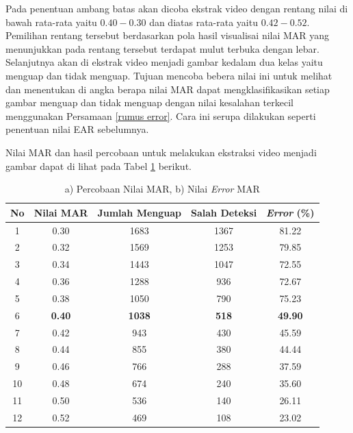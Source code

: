             Pada penentuan ambang batas akan dicoba ekstrak video dengan rentang nilai di bawah rata-rata yaitu $0.40 - 0.30$ dan diatas rata-rata yaitu $0.42 - 0.52$. Pemilihan rentang tersebut berdasarkan pola hasil visualisai nilai MAR yang menunjukkan pada rentang tersebut terdapat mulut terbuka dengan lebar. Selanjutnya akan di ekstrak video menjadi gambar kedalam dua kelas yaitu menguap dan tidak menguap. Tujuan mencoba bebera nilai ini untuk 
            melihat dan menentukan di angka berapa nilai MAR dapat mengklasifikasikan setiap gambar menguap dan tidak menguap dengan nilai kesalahan terkecil menggunakan Persamaan \ref{rumus error}. Cara ini serupa dilakukan seperti penentuan nilai EAR sebelumnya.
            
            Nilai MAR dan hasil percobaan untuk melakukan ekstraksi video menjadi gambar dapat di lihat pada Tabel \ref{Penentuan Nilai MAR} berikut.\\


        
            \begin{table}[h]
            \centering
            \caption{a) Percobaan Nilai MAR, b) Nilai \textit{Error} MAR}
            \begin{tabular}{ccccc}
                \toprule
                \textbf{No} &\textbf{Nilai MAR} & \textbf{Jumlah Menguap} & \textbf{Salah Deteksi} & \textbf{\textit{Error} (\%)} \\
                \midrule
                          1 & 0.30 & 1683 & 1367 &  81.22 \\
                          2 & 0.32 & 1569 & 1253 & 79.85 \\
                          3 & 0.34 & 1443 & 1047 & 72.55 \\
                          4 & 0.36 & 1288 & 936  & 72.67 \\
                          5 & 0.38 & 1050 & 790  & 75.23\\
                         6 & \textbf{0.40} & \textbf{1038}& \textbf{518} &  \textbf{49.90} \\
                          7 & 0.42 & 943 & 430 & 45.59 \\
                          8 & 0.44 & 855 & 380 & 44.44 \\
                          9 & 0.46 & 766 & 288 & 37.59 \\
                          10 & 0.48 & 674 & 240 & 35.60 \\
                          11 & 0.50 & 536 & 140  & 26.11 \\
                          12 & 0.52 & 469 & 108 & 23.02 \\
                         
                    \bottomrule
                \end{tabular}
                \label{Penentuan Nilai MAR}
            \end{table}


